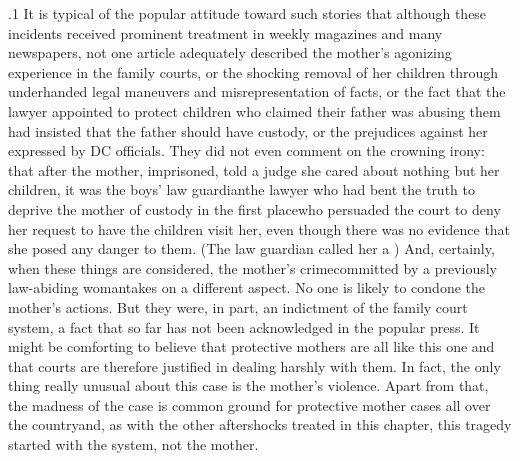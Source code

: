 \documentclass[11pt, twoside]{article}
\begin{document}
{\p.1{%
It is typical of the popular attitude toward such stories that although
these incidents received prominent treatment in weekly magazines
and many newspapers, not one article adequately described the mother’s
agonizing experience in the family courts, or the shocking removal of
her children through underhanded legal maneuvers and misrepresentation of facts, or the fact that the lawyer appointed to protect children
who claimed their father was abusing them had insisted that the father
should have custody, or the prejudices against her expressed
by DC officials. They did not even comment on the crowning
irony: that after the mother, imprisoned, told a judge she cared about
nothing but her children, it was the boys’ law guardian\mdash{}the lawyer who
had bent the truth to deprive the mother of custody in the first
place\mdash{}who persuaded the court to deny her request to have the children visit
her, even though there was no evidence that she posed any danger to
them. (The law guardian called her a )
And, certainly, when these things are considered, the mother’s
crime\mdash{}committed by a previously law-abiding woman\mdash{}takes on a different aspect. No one is likely to condone the mother’s actions. But they
were, in part, an indictment of the family court system, a fact that so far
has not been acknowledged in the popular press. It might be comforting
to believe that protective mothers are all like this one and that courts are
therefore justified in dealing harshly with them. In fact, the only thing
really unusual about this case is the mother’s violence. Apart from that,
the madness of the case is common ground for protective mother cases
all over the country\mdash{}and, as with the other aftershocks treated in this
chapter, this tragedy started with the system, not the mother.
}%





}
\end{document}
